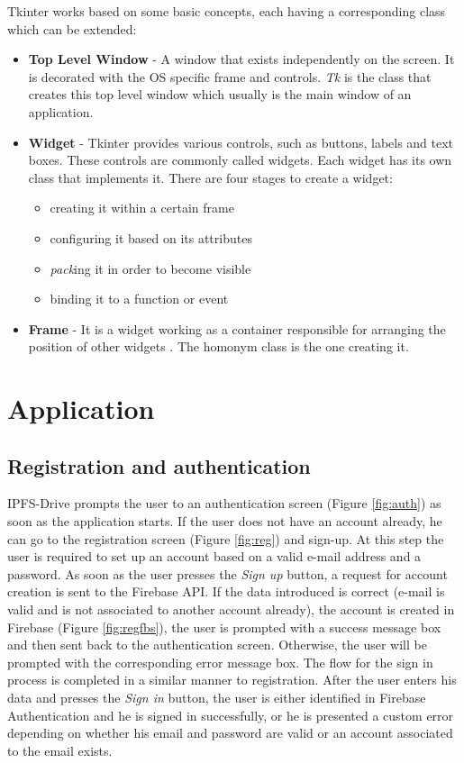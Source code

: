 \documentclass[12pt]{report}
\begin{document}
Tkinter works based on some basic concepts, each having a corresponding class which can be extended:
\begin{itemize}
\item \textbf{Top Level Window} - A window that exists independently on the screen. It is decorated with the OS specific frame and controls. \textit{Tk} is the class that creates this top level window which usually is the main window of an application.
\item \textbf{Widget} - Tkinter provides various controls, such as buttons, labels and text boxes. These controls are commonly called widgets. Each widget has its own class that implements it. There are four stages to create a widget:
\begin{itemize}
\item creating it within a certain frame
\item configuring it based on its attributes
\item \textit{pack}ing it in order to become visible
\item binding it to a function or event 
\end{itemize}
\item \textbf{Frame} - It is a widget working as a container responsible for arranging the position of other widgets . The homonym class is the one creating it.
\end{itemize}

\section{Application}

\subsection{Registration and authentication}

IPFS-Drive prompts the user to an authentication screen (Figure \ref {fig:auth}) as soon as the application starts. If the user does not have an account already, he can go to the registration screen (Figure \ref {fig:reg}) and sign-up. At this step the user is required to set up an account based on a valid e-mail address and a password. As soon as the user presses the \textit{Sign up} button, a request for account creation is sent to the Firebase API. If the data introduced is correct (e-mail is valid and is not associated to another account already), the account is created in Firebase (Figure \ref {fig:regfbs}), the user is prompted with a success message box and then sent back to the authentication screen. Otherwise, the user will be prompted with the corresponding error message box. The flow for the sign in process is completed in a similar manner to registration. After the user enters his data and presses the \textit{Sign in} button, the user is either identified in Firebase Authentication and he is signed in successfully, or he is presented a custom error depending on whether his email and password are valid or an account associated to the email exists. 
\end{document}
